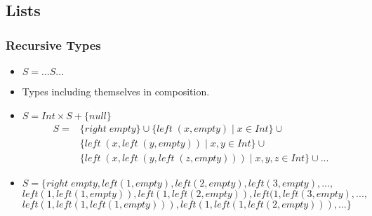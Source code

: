 \subsection{Lists}
\begin{frame}
 \frametitle{Recursive Types}
\begin{itemize}
 \item $S = ... S ...$
 \item Types including themselves in composition.
\end{itemize}
\begin{itemize}
 \item $S = Int \times S + \{null\}$
\[\begin{array}{ll}
S = & \{right\;empty\} \cup \{ left\;(x,empty) \mid x \in Int \} \cup \\
  & \{left\;(x, left\;(y, empty)) \mid x, y \in Int \} \cup \\
  & \{left\;(x, left\;(y, left\;(z,empty))) \mid x,y,z \in Int \} \cup  ...
  \end{array}
\]
\item $S = \{right\;empty, left(1,empty), left(2,empty), left(3,empty), ...,$\\
	$left(1,left(1,empty)), left(1,left(2,empty)), left(1,left(3,empty),...,$\\
	$left(1,left(1,left(1,empty))), left(1,left(1,left(2,empty))), ...\}$
\end{itemize}
\end{frame}

